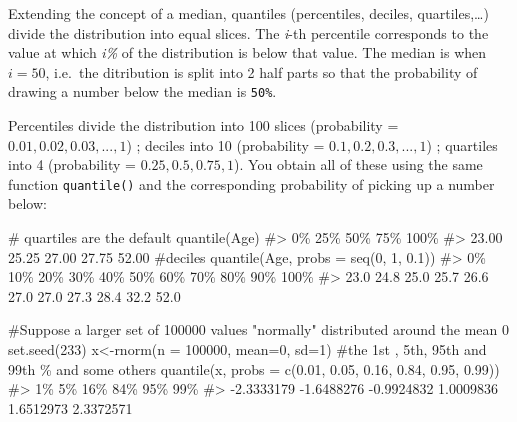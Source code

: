 \documentclass[
  letterpaper,
  DIV=11,
  numbers=noendperiod]{scrreprt}
\newenvironment{Shaded}{\begin{snugshade}}{\end{snugshade}}
\newcommand{\AttributeTok}[1]{\textcolor[rgb]{0.40,0.45,0.13}{#1}}
\newcommand{\CommentTok}[1]{\textcolor[rgb]{0.37,0.37,0.37}{#1}}
\newcommand{\DecValTok}[1]{\textcolor[rgb]{0.68,0.00,0.00}{#1}}
\newcommand{\FloatTok}[1]{\textcolor[rgb]{0.68,0.00,0.00}{#1}}
\newcommand{\FunctionTok}[1]{\textcolor[rgb]{0.28,0.35,0.67}{#1}}
\newcommand{\NormalTok}[1]{\textcolor[rgb]{0.00,0.23,0.31}{#1}}
\newcommand{\OtherTok}[1]{\textcolor[rgb]{0.00,0.23,0.31}{#1}}
\begin{document}
Extending the concept of a median, quantiles (percentiles, deciles,
quartiles,\ldots) divide the distribution into equal slices. The
\emph{i}-th percentile corresponds to the value at which \emph{i\%} of
the distribution is below that value. The median is when \(i=50%
\), i.e.~the ditribution is split into 2 half parts so that the
probability of drawing a number below the median is \texttt{50\%}.

Percentiles divide the distribution into 100 slices (probability =
\({0.01, 0.02, 0.03, ..., 1}\)) ; deciles into 10 (probability =
\({0.1, 0.2, 0.3, ..., 1}\)) ; quartiles into 4 (probability =
\({0.25, 0.5, 0.75, 1}\)). You obtain all of these using the same
function \texttt{quantile()} and the corresponding probability of
picking up a number below:

\begin{Shaded}
\begin{Highlighting}[]
\CommentTok{\# quartiles are the default}
\FunctionTok{quantile}\NormalTok{(Age)}
\CommentTok{\#\textgreater{}    0\%   25\%   50\%   75\%  100\% }
\CommentTok{\#\textgreater{} 23.00 25.25 27.00 27.75 52.00}
\CommentTok{\#deciles}
\FunctionTok{quantile}\NormalTok{(Age, }\AttributeTok{probs =} \FunctionTok{seq}\NormalTok{(}\DecValTok{0}\NormalTok{, }\DecValTok{1}\NormalTok{, }\FloatTok{0.1}\NormalTok{))}
\CommentTok{\#\textgreater{}   0\%  10\%  20\%  30\%  40\%  50\%  60\%  70\%  80\%  90\% 100\% }
\CommentTok{\#\textgreater{} 23.0 24.8 25.0 25.7 26.6 27.0 27.0 27.3 28.4 32.2 52.0}

\CommentTok{\#Suppose a larger set of 100000 values "normally" distributed around the mean 0}
\FunctionTok{set.seed}\NormalTok{(}\DecValTok{233}\NormalTok{)}
\NormalTok{x}\OtherTok{\textless{}{-}}\FunctionTok{rnorm}\NormalTok{(}\AttributeTok{n =} \DecValTok{100000}\NormalTok{, }\AttributeTok{mean=}\DecValTok{0}\NormalTok{, }\AttributeTok{sd=}\DecValTok{1}\NormalTok{)}
\CommentTok{\#the 1st , 5th, 95th and 99th \% and some others}
\FunctionTok{quantile}\NormalTok{(x, }\AttributeTok{probs =} \FunctionTok{c}\NormalTok{(}\FloatTok{0.01}\NormalTok{, }\FloatTok{0.05}\NormalTok{, }\FloatTok{0.16}\NormalTok{, }\FloatTok{0.84}\NormalTok{, }\FloatTok{0.95}\NormalTok{, }\FloatTok{0.99}\NormalTok{))}
\CommentTok{\#\textgreater{}         1\%         5\%        16\%        84\%        95\%        99\% }
\CommentTok{\#\textgreater{} {-}2.3333179 {-}1.6488276 {-}0.9924832  1.0009836  1.6512973  2.3372571}
\end{Highlighting}
\end{Shaded}
\end{document}
